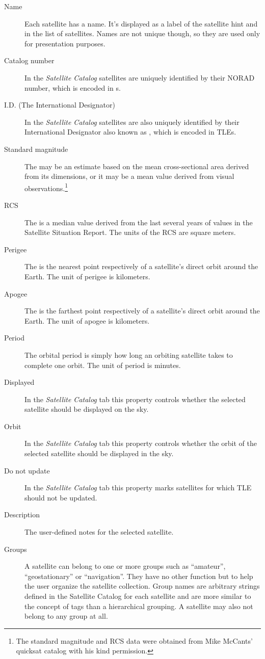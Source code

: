 \begin{description}
\item[Name] Each satellite has a name. It's displayed as a label of
  the satellite hint and in the list of satellites. Names are not
  unique though, so they are used only for presentation purposes.
\item[Catalog number] In the \emph{Satellite Catalog} satellites are
  uniquely identified by their NORAD number, which is encoded in
  s.
\item[I.D. (The International Designator)] In the \emph{Satellite
  Catalog} satellites are also uniquely identified by their
  International Designator also known as ,
  which is encoded in TLEs.
\item[Standard magnitude] The  may be an estimate based on the
  mean cross-sectional area derived from its dimensions, or it may be
  a mean value derived from visual observations.\footnote{The standard
    magnitude and RCS data were obtained from Mike McCants' quicksat
    catalog with his kind permission.}
\item[RCS] The  is a median value derived from the last several years of
  values in the Satellite Situation Report. The units of the RCS are
  square meters.
\item[Perigee] The  is the nearest point respectively of a
  satellite's direct orbit around the Earth. The unit of perigee is
  kilometers.
\item[Apogee] The  is the farthest point
  respectively of a satellite's direct orbit around the Earth. The
  unit of apogee is kilometers.
\item[Period] The orbital period is simply how long an orbiting
  satellite takes to complete one orbit. The unit of period is
  minutes.
\item[Displayed] In the \emph{Satellite Catalog} tab this property
  controls whether the selected satellite should be displayed on the
  sky.
\item[Orbit] In the \emph{Satellite Catalog} tab this property
  controls whether the orbit of the selected satellite should be
  displayed in the sky.
\item[Do not update] In the \emph{Satellite Catalog} tab this property
  marks satellites for which TLE should not be updated.
\item[Description] The user-defined notes for the selected satellite.
\item[Groups]
A satellite can belong to one or more groups such as ``amateur'',
``geostationary'' or ``navigation''. They have no other function but
to help the user organize the satellite collection.  Group names are
arbitrary strings defined in the Satellite Catalog for each satellite
and are more similar to the concept of tags than a hierarchical
grouping. A satellite may also not belong to any group at all.


\end{description}
